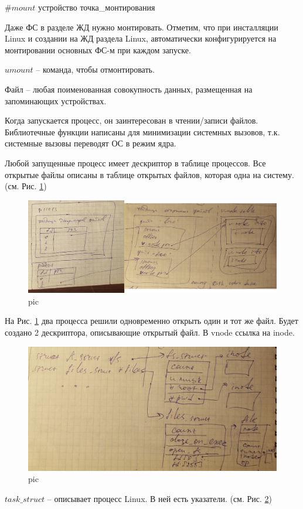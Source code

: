 $\# mount$ устройство точка\_монтирования

Даже ФС в разделе ЖД нужно монтировать. Отметим, что при инсталляции Linux и создании на ЖД раздела Linux, автоматически конфигурируется на монтировании основных ФС-м при каждом запуске.

$umount$ – команда, чтобы отмонтировать.

Файл – любая поименованная совокупность данных, размещенная на запоминающих устройствах.

Когда запускается процесс, он заинтересован в чтении/записи файлов. Библиотечные функции написаны для минимизации системных вызовов, т.к. системные вызовы переводят ОС в режим ядра.

Любой запущенные процесс имеет дескриптор в таблице процессов. Все открытые файлы описаны в таблице открытых файлов, которая одна на систему. (см. Рис. \ref{pic:proc_open_file})

\begin{figure}[H]
  \centering
  \includegraphics[width=\textwidth]{pic/3.png}
  \caption{pic}
  \label{pic:proc_open_file}
\end{figure}

На Рис. \ref{pic:proc_open_file} два процесса решили одновременно открыть один и тот же файл. Будет создано 2 дескриптора, описывающие открытый файл. В vnode ссылка на inode.

\begin{figure}[H]
  \centering
  \includegraphics[width=\textwidth]{pic/4.png}
  \caption{pic}
  \label{pic:task_struct}
\end{figure}

$task\_struct$ – описывает процесс Linux. В ней есть указатели. (см. Рис. \ref{pic:task_struct})

 


